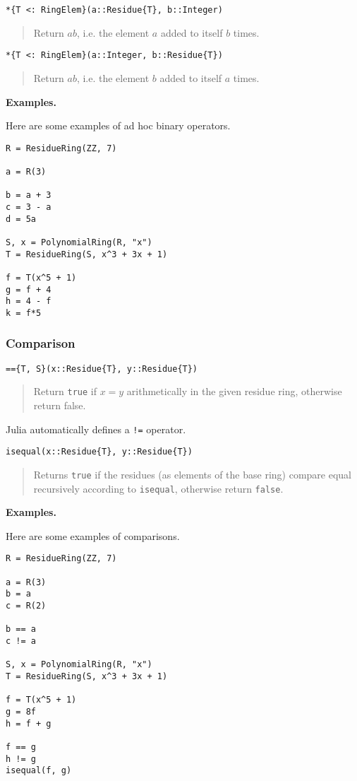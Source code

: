\documentclass[a4paper,10pt]{article}
\newcommand{\code}{\lstinline}
\newcommand{\desc}[1]{\vspace{-3mm}\begin{quote}#1\end{quote}}
\begin{document}
\begin{lstlisting}
*{T <: RingElem}(a::Residue{T}, b::Integer)
\end{lstlisting}

\desc{Return $ab$, i.e. the element $a$ added to itself $b$ times.}

\begin{lstlisting}
*{T <: RingElem}(a::Integer, b::Residue{T})
\end{lstlisting}

\desc{Return $ab$, i.e. the element $b$ added to itself $a$ times.}

\textbf{Examples.}

Here are some examples of ad hoc binary operators.

\begin{lstlisting}
R = ResidueRing(ZZ, 7)

a = R(3)

b = a + 3
c = 3 - a
d = 5a

S, x = PolynomialRing(R, "x")
T = ResidueRing(S, x^3 + 3x + 1)

f = T(x^5 + 1)
g = f + 4
h = 4 - f
k = f*5
\end{lstlisting}

\subsubsection{Comparison}

\begin{lstlisting}
=={T, S}(x::Residue{T}, y::Residue{T})
\end{lstlisting}

\desc{Return \code{true} if $x = y$ arithmetically in the given residue ring, 
otherwise return false.}

Julia automatically defines a \code{!=} operator.

\begin{lstlisting}
isequal(x::Residue{T}, y::Residue{T})
\end{lstlisting}

\desc{Returns \code{true} if the residues (as elements of the base ring) compare
equal recursively according to \code{isequal}, otherwise return \code{false}.}

\textbf{Examples.}

Here are some examples of comparisons.

\begin{lstlisting}
R = ResidueRing(ZZ, 7)

a = R(3)
b = a
c = R(2)

b == a
c != a

S, x = PolynomialRing(R, "x")
T = ResidueRing(S, x^3 + 3x + 1)

f = T(x^5 + 1)
g = 8f
h = f + g

f == g
h != g
isequal(f, g)
\end{lstlisting}
\end{document}

